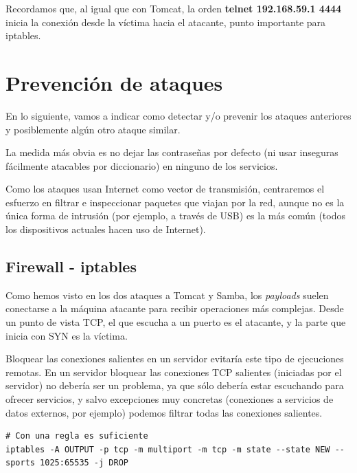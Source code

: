 \documentclass[a4paper,12pt]{scrartcl}
\begin{document}
Recordamos que, al igual que con Tomcat, la orden \textbf{telnet 192.168.59.1 4444} inicia la conexión desde la víctima hacia el atacante, punto importante para iptables.

\section{Prevención de ataques}

En lo siguiente, vamos a indicar como detectar y/o prevenir los ataques anteriores y posiblemente algún otro ataque similar.


La medida más obvia es no dejar las contraseñas por defecto (ni usar inseguras fácilmente atacables por diccionario) en ninguno de los servicios.


\vspace{10pt}

Como los ataques usan Internet como vector de transmisión, centraremos el esfuerzo en filtrar e inspeccionar paquetes que viajan por la red, aunque no es la única forma de intrusión (por ejemplo, a través de USB) es la más común (todos los dispositivos actuales hacen uso de Internet).

\subsection{Firewall - iptables}

Como hemos visto en los dos ataques a Tomcat y Samba, los \textit{payloads} suelen conectarse a la máquina atacante para recibir operaciones más complejas. Desde un punto de vista TCP, el que escucha a un puerto es el atacante, y la parte que inicia con SYN es la víctima. 

\vspace{10pt}

Bloquear las conexiones salientes en un servidor evitaría este tipo de ejecuciones remotas. En un servidor bloquear las conexiones TCP salientes (iniciadas por el servidor) no debería ser un problema, ya que sólo debería estar escuchando para ofrecer servicios, y salvo excepciones muy concretas (conexiones a servicios de datos externos, por ejemplo) podemos filtrar todas las conexiones salientes.

\vspace{10pt}


\begin{lstlisting}[breaklines]
# Con una regla es suficiente
iptables -A OUTPUT -p tcp -m multiport -m tcp -m state --state NEW --sports 1025:65535 -j DROP
\end{lstlisting}
\end{document}
